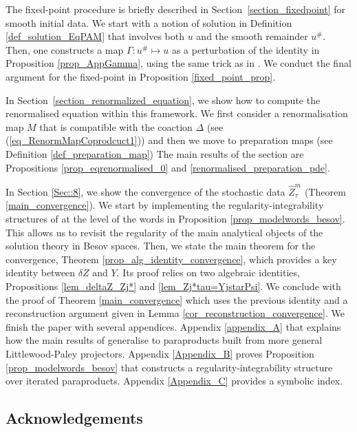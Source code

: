 \documentclass[11pt]{preprint}
\newcounter{theorem}
\def\eqref#1{(\ref{#1})}
\begin{document}
The fixed-point procedure is briefly described in Section~\ref{section_fixedpoint} for smooth initial data. We start with a notion of solution in Definition \ref{def_solution_EqPAM} that involves both $u$ and the smooth remainder $ u^\#$. Then, one constructs a  map $\Gamma : u^\# \mapsto u$ as a perturbation of the identity in Proposition \ref{prop_AppGamma}, using the same trick as in \cite[Lemma 4.12]{AllezChouk}. We conduct the final argument for the fixed-point in Proposition \ref{fixed_point_prop}.
	
	
	
	
	 In Section~\ref{section_renormalized_equation}, we show how to compute the renormalised equation within this framework.  We first consider a renormalisation map $M$ that is compatible with the coaction $ \Delta$
	(see \eqref{eq_RenormMapCoprodcuct1}) and then we move to preparation maps (see Definition \ref{def_preparation_map}) The main results of the section are Propositions \ref{prop_eqrenormalised_0}
	and \ref{renormalised_preparation_pde}.

	
	In Section \ref{Sec::8}, we show the convergence of the stochastic data $\widehat{Z}^m_{\tau}$ (Theorem \ref{main_convergence}). We start by implementing the  regularity-integrability structures of \cite{Hos25,BH23} at the level of the words in Proposition \ref{prop_modelwords_besov}. This allows us to revisit the regularity of the main analytical objects of the solution theory in Besov spaces.  Then, we state the main theorem for the convergence, Theorem \ref{prop_alg_identity_convergence}, which provides a key identity between $ \delta Z $ and $Y$. Its proof relies on two algebraic identities, Propositions \ref{lem_deltaZ_Zj*} and \ref{lem_Zj*tau=YjstarPsi}.  We conclude with the proof of Theorem \ref{main_convergence} which uses the previous identity and a reconstruction argument given in Lemma \ref{cor_reconstruction_convergence}. 
		We finish the paper with several appendices. Appendix \ref{appendix_A} that explains how the main results of \cite{LocalExpansionsParacSystems} generalise to paraproducts built from more general Littlewood-Paley projectors. 
		Appendix \ref{Appendix_B} proves Proposition \ref{prop_modelwords_besov} that constructs a regularity-integrability structure over iterated paraproducts.
		Appendix \ref{Appendix_C} provides a symbolic index.
	
	 \subsection*{Acknowledgements}
	
\end{document}
